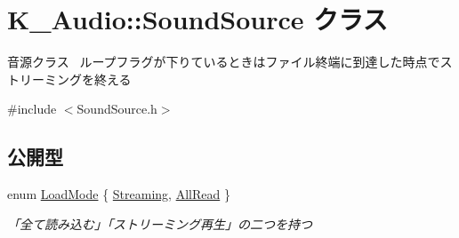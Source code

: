 \hypertarget{class_k___audio_1_1_sound_source}{}\section{K\+\_\+\+Audio\+:\+:Sound\+Source クラス}
\label{class_k___audio_1_1_sound_source}


音源クラス~\newline
ループフラグが下りているときはファイル終端に到達した時点でストリーミングを終える  




{\ttfamily \#include $<$Sound\+Source.\+h$>$}

\subsection*{公開型}
\begin{DoxyCompactItemize}
\item 
enum \mbox{\hyperlink{class_k___audio_1_1_sound_source_ad0e58f4cea821bc4087ed13830b06f69}{Load\+Mode}} \{ \mbox{\hyperlink{class_k___audio_1_1_sound_source_ad0e58f4cea821bc4087ed13830b06f69a93ac3d22ea295b4cee4a699c6710402e}{Streaming}}, 
\mbox{\hyperlink{class_k___audio_1_1_sound_source_ad0e58f4cea821bc4087ed13830b06f69a510c98197d74c0c8ea23a66a1c8a3e53}{All\+Read}}
 \}
\begin{DoxyCompactList}\small\item\em 「全て読み込む」「ストリーミング再生」の二つを持つ \end{DoxyCompactList}\end{DoxyCompactItemize}
